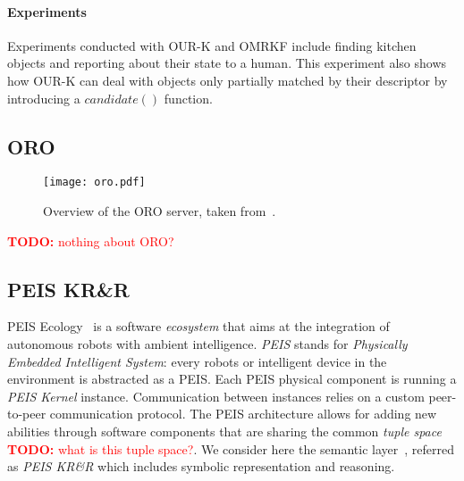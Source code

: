 \documentclass[journal]{IEEEtran}
\newcommand{\todo}[1]{\textcolor{red}{\textbf{TODO:} #1}}
\begin{document}
\paragraph{Experiments} Experiments conducted with OUR-K and OMRKF include
finding kitchen objects and reporting about their state to a human.  This
experiment also shows how OUR-K can deal with objects only partially matched by
their descriptor by introducing a $candidate()$ function.


\subsection{ORO}
\label{sect|oro}

\begin{figure}
    \centering
    \texttt{[image: oro.pdf]}

    \caption{Overview of the ORO server, taken from~\cite{Lemaignan2012}.}

    \label{fig|oro}
\end{figure}

\todo{nothing about ORO?}


\subsection{PEIS KR\&R}
\label{sect|peis-ecology}

{\sc PEIS Ecology}~\cite{Saffiotti2005} is a software \emph{ecosystem} that 
aims at the integration of autonomous robots with ambient intelligence.
\emph{PEIS} stands for \emph{Physically Embedded Intelligent System}: every
robots or intelligent device in the environment is abstracted as a PEIS. Each 
PEIS physical component is running a \emph{PEIS Kernel} instance. Communication 
between instances relies on a custom peer-to-peer communication protocol.
The PEIS architecture allows for adding new abilities through software 
components that are sharing the common \emph{tuple space} \todo{what is this 
tuple space?}.
We consider here the semantic layer~\cite{Daoutis2009}, referred as \emph{PEIS
KR\&R} which includes symbolic representation and reasoning.
% 
\end{document}
